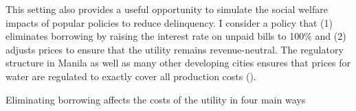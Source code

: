 \documentclass[12pt]{article}
\begin{document}
\begin{table}[H]
\centering
\caption{Counterfactual Policies}\label{table:counter}
\end{table}




This setting also provides a useful opportunity to simulate the social welfare impacts of popular policies to reduce delinquency.  I consider a policy that (1) eliminates borrowing by raising the interest rate on unpaid bills to 100\% and (2) adjusts prices to ensure that the utility remains revenue-neutral.  The regulatory structure in Manila as well as many other developing cities ensures that prices for water are regulated to exactly cover all production costs (\cite{hoque2013state}).

Eliminating borrowing affects the costs of the utility in four main ways
\end{document}
